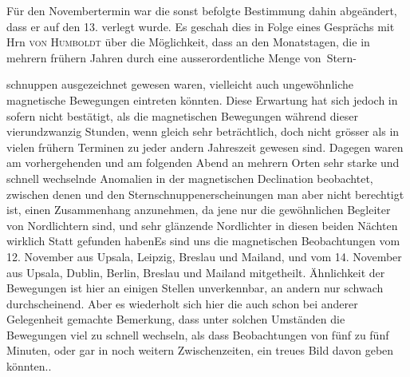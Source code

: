 Für den Novembertermin war die sonst befolgte Bestimmung dahin abgeändert, dass er auf den 13. verlegt wurde. Es geschah dies in Folge eines Gesprächs mit Hrn \textsc{von Humboldt} über die Möglichkeit, dass an den Monatstagen, die in mehrern frühern Jahren durch eine ausserordentliche Menge von~Stern-\par
\clearpage
\begingroup\renewcommand{\footnoterule}{\kern-4.35pt\hrule width .253\columnwidth height .35pt\kern4pt}
\noindent schnuppen ausgezeichnet gewesen waren, vielleicht auch ungewöhnliche magnetische Bewegungen eintreten könnten. Diese Erwartung hat sich jedoch in sofern nicht bestätigt, als die magnetischen Bewegungen während dieser vierundzwanzig Stunden, wenn gleich sehr beträchtlich, doch nicht grösser als in vielen frühern Terminen zu jeder andern Jahreszeit gewesen sind. Dagegen waren am vorhergehenden und am folgenden Abend an mehrern Orten sehr starke und schnell wechselnde Anomalien in der magnetischen Declination beobachtet, zwischen denen und den Sternschnuppenerscheinungen man aber nicht berechtigt ist, einen Zusammenhang anzunehmen, da jene nur die gewöhnlichen Begleiter von Nordlichtern sind, und sehr glänzende Nordlichter in diesen beiden Nächten wirklich Statt gefunden haben\expandafter\def\csname HistoricalNoteText583\endcsname{Es sind uns die magnetischen Beobachtungen vom 12. November aus Upsala, Leipzig, Breslau und Mailand, und vom 14. November aus Upsala, Dublin, Berlin, Breslau und Mailand mitgetheilt. Ähnlichkeit der Bewegungen ist hier an einigen Stellen unverkennbar, an andern nur schwach durchscheinend. Aber es wiederholt sich hier die auch schon bei anderer Gelegenheit gemachte Bemerkung, dass unter solchen Umständen die Bewegungen viel zu schnell wechseln, als dass Beobachtungen von fünf zu fünf Minuten, oder gar in noch weitern Zwischenzeiten, ein treues Bild davon geben könnten.}.
\par\smallskip\noindent\hspace*{.07\linewidth}\makebox[.93\linewidth][s]{---\hfill---\hfill---\hfill---\hfill---\hfill---\hfill---\hfill---\hfill---\hfill---\hfill---\hfill---\hfill---\hfill---\hfill---\hfill---}\par\smallskip
